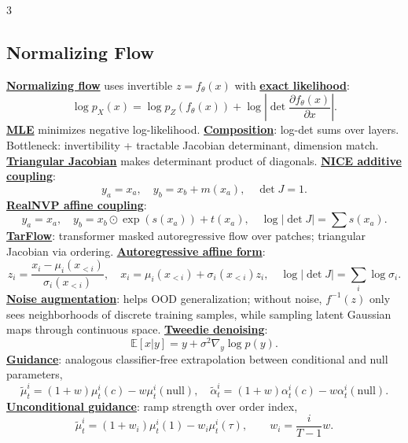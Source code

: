 \documentclass{article}
\numberwithin{equation}{subsection}
\newcommand{\lowterm}[1]{\textbf{\underline{#1}}}
\newcommand{\E}{\mathbb{E}}
\begin{document}
\begin{multicols*}{3}
\subsection{Normalizing Flow}
\lowterm{Normalizing flow} uses invertible $z=f_\theta(x)$ with \lowterm{exact likelihood}:
\[
\log p_X(x)=\log p_Z(f_\theta(x))+\log\left|\det\frac{\partial f_\theta(x)}{\partial x}\right|.
\]
\lowterm{MLE} minimizes negative log-likelihood. \lowterm{Composition}: log-det sums over layers. Bottleneck: invertibility + tractable Jacobian determinant, dimension match. \lowterm{Triangular Jacobian} makes determinant product of diagonals. \lowterm{NICE additive coupling}:
\[
y_a=x_a,\quad y_b=x_b+m(x_a),\quad \det J=1.
\]
\lowterm{RealNVP affine coupling}:
\[
y_a=x_a,\quad y_b=x_b\odot\exp(s(x_a))+t(x_a),\quad \log|\det J|=\sum s(x_a).
\]
\lowterm{TarFlow}: transformer masked autoregressive flow over patches; triangular Jacobian via ordering. \lowterm{Autoregressive affine form}:
\[
z_i=\frac{x_i-\mu_i(x_{<i})}{\sigma_i(x_{<i})},\quad
x_i=\mu_i(x_{<i})+\sigma_i(x_{<i})z_i,\quad
\log|\det J|=\sum_i\log\sigma_i .
\]
\lowterm{Noise augmentation}: helps OOD generalization; without noise, $f^{-1}(z)$ only sees neighborhoods of discrete training samples, while sampling latent Gaussian maps through continuous space. \lowterm{Tweedie denoising}:
\[
\E[x|y]=y+\sigma^2\nabla_y\log p(y).
\]
\lowterm{Guidance}: analogous classifier-free extrapolation between conditional and null parameters,
\[
\tilde\mu_t^i=(1+w)\mu_t^i(c)-w\mu_t^i(\mathrm{null}),\quad
\tilde\alpha_t^i=(1+w)\alpha_t^i(c)-w\alpha_t^i(\mathrm{null}).
\]
\lowterm{Unconditional guidance}: ramp strength over order index,
\[
\tilde\mu_t^i=(1+w_i)\mu_t^i(1)-w_i\mu_t^i(\tau),\qquad
w_i=\frac{i}{T-1}w.
\]


\end{multicols*}
\end{document}
